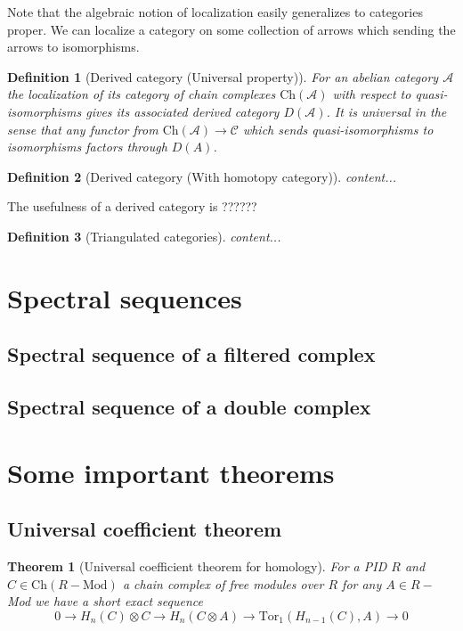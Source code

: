 \documentclass[12pt]{article}
\numberwithin{equation}{section}
\newtheorem{theorem}{Theorem}[section]
\newtheorem{definition}{Definition}[section]
\begin{document}
	Note that the algebraic notion of localization easily generalizes to categories proper. We can localize a category on some collection of arrows which sending the arrows to isomorphisms.
	
	\begin{definition}[Derived category (Universal property)]
		For an abelian category $\mathcal{A}$ the localization of its category of chain complexes $\mathrm{Ch}(\mathcal{A})$ with respect to quasi-isomorphisms gives its associated derived category $D(\mathcal{A})$. It is universal in the sense that any functor from $\mathrm{Ch}(\mathcal{A}) \to \mathcal{C}$ which sends quasi-isomorphisms to isomorphisms factors through $D(A)$.
	\end{definition}
	
	\begin{definition}[Derived category (With homotopy category)]
		content...
	\end{definition}
	
	The usefulness of a derived category is ??????
	
	\begin{definition}[Triangulated categories]
		content...
	\end{definition}
	
	\section{Spectral sequences}
	\subsection{Spectral sequence of a filtered complex}
	
	\subsection{Spectral sequence of a double complex}
	
	
	\section{Some important theorems}
	\subsection{Universal coefficient theorem}
	\begin{theorem}[Universal coefficient theorem for homology]
	For a PID $R$ and $C\in \mathrm{Ch}(R-\mathrm{Mod})$ a chain complex of free modules over $R$ for any $A \in R-$Mod we have a short exact sequence \[ 0 \to H_n(C) \otimes C  \to H_n(C\otimes A) \to \mathrm{Tor}_1(H_{n-1}(C),A) \to 0\]
	\end{theorem}
\end{document}

